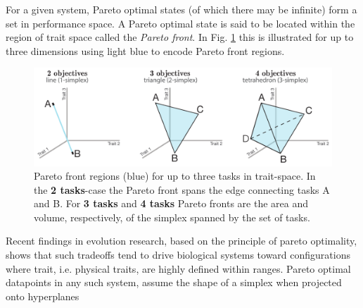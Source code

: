 For a given system, Pareto optimal states (of which there may be infinite) form a set in performance space.  A Pareto optimal state is said to be located within the region of trait space called the \textit{Pareto front}. In Fig. \ref{fig:paretoFront} this is illustrated for up to three dimensions using light blue to encode Pareto front regions. 

\begin{figure}[h]
\centering
\includegraphics[width=\linewidth]{figures/paretoFronts.pdf} 
\caption{Pareto front regions (blue) for up to three tasks in trait-space. In the \textbf{2 tasks}-case the Pareto front spans the edge connecting tasks A and B. For \textbf{3 tasks} and \textbf{4 tasks} Pareto fronts are the area and volume, respectively, of the simplex spanned by the set of tasks.}
\label{fig:paretoFront}
\end{figure}
Recent findings in evolution research, based on the principle of pareto optimality, shows that such tradeoffs tend to drive biological systems toward configurations where trait, i.e. physical traits, are highly defined within ranges. Pareto optimal datapoints in any such system, assume the shape of a simplex when projected onto hyperplanes